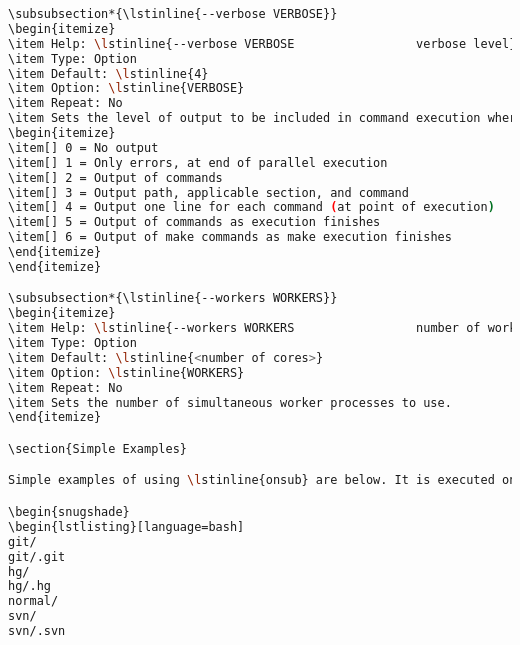 \begin{snugshade}
\begin{lstlisting}[language=bash]
\subsubsection*{\lstinline{--verbose VERBOSE}}
\begin{itemize}
\item Help: \lstinline{--verbose VERBOSE                 verbose level}
\item Type: Option
\item Default: \lstinline{4}
\item Option: \lstinline{VERBOSE}
\item Repeat: No
\item Sets the level of output to be included in command execution where higher numbers include output of lower numbers:
\begin{itemize}
\item[] 0 = No output
\item[] 1 = Only errors, at end of parallel execution
\item[] 2 = Output of commands
\item[] 3 = Output path, applicable section, and command
\item[] 4 = Output one line for each command (at point of execution)
\item[] 5 = Output of commands as execution finishes
\item[] 6 = Output of make commands as make execution finishes
\end{itemize}
\end{itemize}

\subsubsection*{\lstinline{--workers WORKERS}}
\begin{itemize}
\item Help: \lstinline{--workers WORKERS                 number of workers}
\item Type: Option
\item Default: \lstinline{<number of cores>}
\item Option: \lstinline{WORKERS}
\item Repeat: No
\item Sets the number of simultaneous worker processes to use.
\end{itemize}

\section{Simple Examples}

Simple examples of using \lstinline{onsub} are below. It is executed on a \Mac\ and the directory structure is assumed to be the following:

\begin{snugshade}
\begin{lstlisting}[language=bash]
git/
git/.git
hg/
hg/.hg
normal/
svn/
svn/.svn
\end{lstlisting}
\end{snugshade}
	
